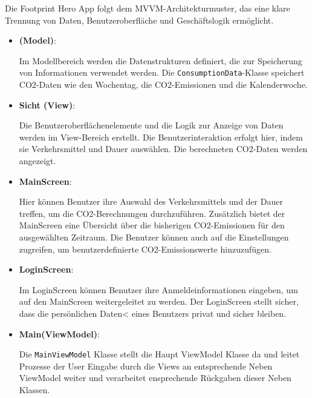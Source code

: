\documentclass{article}
\begin{document}
Die Footprint Hero App folgt dem MVVM-Architekturmuster, das eine klare Trennung von Daten, Benutzeroberfläche und Geschäftslogik ermöglicht.
\begin{itemize}
\item \textbf{(Model)}:

Im Modellbereich werden die Datenstrukturen definiert, die zur Speicherung von Informationen verwendet werden. Die \texttt{ConsumptionData}-Klasse speichert CO2-Daten wie den Wochentag, die CO2-Emissionen und die Kalenderwoche.

\item \textbf{Sicht (View)}:

Die Benutzeroberflächenelemente und die Logik zur Anzeige von Daten werden im View-Bereich erstellt. Die Benutzerinteraktion erfolgt hier, indem sie Verkehrsmittel und Dauer auswählen. Die berechneten CO2-Daten werden angezeigt.

\item \textbf{MainScreen}:

Hier können Benutzer ihre Auswahl des Verkehrsmittels und der Dauer treffen, um die CO2-Berechnungen durchzuführen. Zusätzlich bietet der MainScreen eine Übersicht über die bisherigen CO2-Emissionen für den ausgewählten Zeitraum. Die Benutzer können auch auf die Einstellungen zugreifen, um benutzerdefinierte CO2-Emissionswerte hinzuzufügen.


\item \textbf{LoginScreen}:

Im LoginScreen können Benutzer ihre Anmeldeinformationen eingeben, um auf den MainScreen weitergeleitet zu werden. Der LoginScreen stellt sicher, dass die persönlichen Daten< eines Benutzers privat und sicher bleiben.


\item \textbf{Main(ViewModel)}:

Die \texttt{MainViewModel} Klasse stellt die Haupt ViewModel Klasse da und leitet Prozesse der User Eingabe durch die Views an entsprechende Neben ViewModel weiter und verarbeitet ensprechende Rückgaben dieser Neben Klassen.


\end{itemize}
\end{document}
